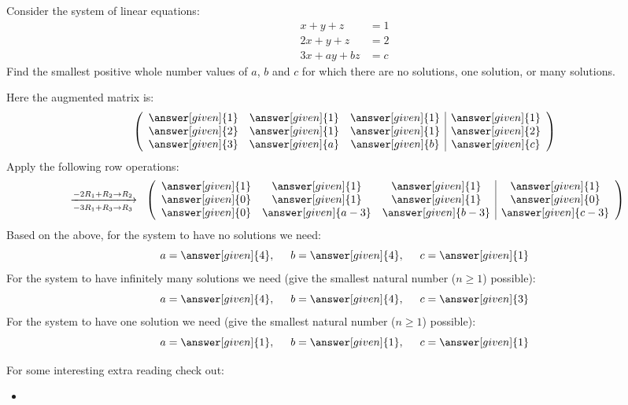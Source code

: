 \documentclass{ximera}
\begin{document}
\begin{example}
  Consider the system of linear equations:
  \begin{align*}
    x+y+z &=  1\\
    2x+y+z &=  2\\
    3x+ay+bz &= c
  \end{align*}
  Find the smallest positive whole number values of $a$, $b$ and $c$
  for which there are no solutions, one solution, or many solutions.
  \begin{explanation}
    Here the augmented matrix is:
    \[\left(\begin{array}{ccc|c}
    \answer[given]{1} &  \answer[given]{1} &  \answer[given]{1} &  \answer[given]{1} \\
    \answer[given]{2} &  \answer[given]{1} &  \answer[given]{1} &  \answer[given]{2} \\
    \answer[given]{3} &  \answer[given]{a} &  \answer[given]{b} &  \answer[given]{c} 
    \end{array}\right)\]
    Apply the following row operations:
    \[
    \hspace{.2cm} \xrightarrow[-3R_{1}+R_{3}\rightarrow R_{3}]
           {-2R_{1} + R_{2}\rightarrow R_{2}}\hspace{.2cm}
    \left(\begin{array}{ccc|c}
      \answer[given]{1} &  \answer[given]{1} &  \answer[given]{1} &  \answer[given]{1} \\
      \answer[given]{0} &  \answer[given]{1} &  \answer[given]{1} &  \answer[given]{0} \\
      \answer[given]{0} &  \answer[given]{a-3} &  \answer[given]{b-3} &  \answer[given]{c-3}
    \end{array}\right)\]
    Based on the above, for the system to have no solutions we need: 
    \[
    a = \answer[given]{4}, \hspace{.5cm} b = \answer[given]{4}, \hspace{.5cm} c = \answer[given]{1}
    \]
    For the system to have infinitely many solutions we need (give the smallest natural number ($n\geq 1$) possible):
    \[
    a = \answer[given]{4}, \hspace{.5cm} b = \answer[given]{4}, \hspace{.5cm} c = \answer[given]{3}
    \]
    For the system to have one solution we need (give the smallest natural number ($n\geq 1$) possible):
    \[
    a = \answer[given]{1}, \hspace{.5cm} b = \answer[given]{1}, \hspace{.5cm} c = \answer[given]{1}
    \]
  \end{explanation}
\end{example}
    

For some interesting extra reading check out:
\begin{itemize}
\item {}
\end{itemize}
\end{document}
